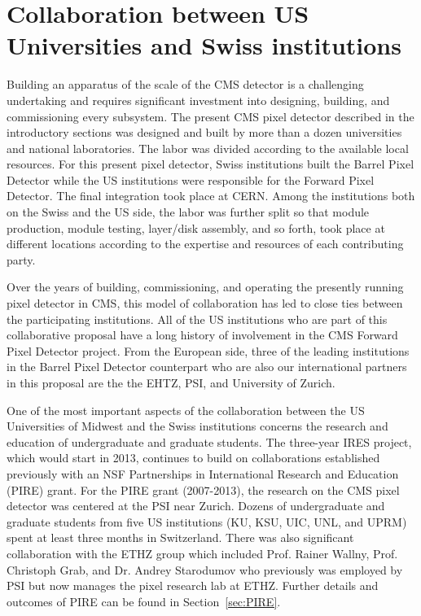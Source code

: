 
\section{Collaboration between US Universities and
Swiss institutions}
\label{sec:ties}


Building an apparatus of the scale of the CMS detector is a
challenging undertaking and requires significant investment into
designing, building, and commissioning every subsystem. The present
CMS pixel detector described in the introductory sections was designed
and built by more than a dozen universities and national laboratories.
The labor was divided according to the available local resources.  For
this present pixel detector, Swiss institutions built the Barrel Pixel
Detector while the US institutions were responsible for the Forward
Pixel Detector. The final integration took place at CERN. Among the
institutions both on the Swiss and the US side, the labor was further
split so that module production, module testing, layer/disk assembly,
and so forth, took place at different locations according to the
expertise and resources of each contributing party.

Over the years of building, commissioning, and operating the presently
running pixel detector in CMS, this model of collaboration has led to
close ties between the participating institutions. All of the US
institutions who are part of this collaborative proposal have a long
history of involvement in the CMS Forward Pixel Detector project. From
the European side, three of the leading institutions in the Barrel Pixel
Detector counterpart who are also our international partners in this
proposal are the the EHTZ, PSI, and University of Zurich.

One of the most important aspects of the collaboration between the US
Universities of Midwest and the Swiss institutions
concerns the research and education of undergraduate and graduate
students. The three-year IRES project, which would start in 2013,
continues to build on collaborations established previously with an
NSF Partnerships in International Research and Education (PIRE)
grant. For the PIRE grant (2007-2013), the research on the CMS pixel
detector was centered at the PSI near Zurich. Dozens of undergraduate
and graduate students from five US institutions (KU, KSU, UIC, UNL,
and UPRM) spent at least three months in Switzerland.  There was also
significant collaboration with the ETHZ group which included
Prof. Rainer Wallny, Prof. Christoph Grab, and Dr. Andrey Starodumov who
previously was employed by PSI but now manages the pixel research lab
at ETHZ. Further details and outcomes of PIRE can be found in 
Section~\ref{sec:PIRE}.

